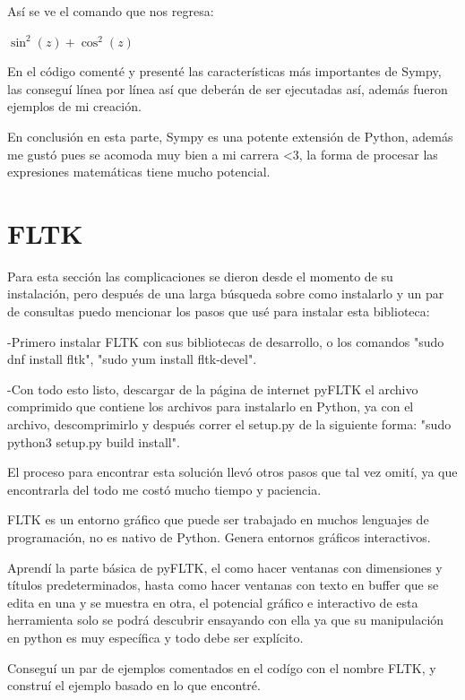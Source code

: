 \documentclass[]{article}
\begin{document}
Así se ve el comando que nos regresa:

$ \sin^{2}{\left(z \right)} + \cos^{2}{\left(z \right)} $

En el código comenté y presenté las características más importantes de Sympy, las conseguí línea por línea así que deberán de ser ejecutadas así, además fueron ejemplos de mi creación.

En conclusión en esta parte, Sympy es una potente extensión de Python, además me gustó pues se acomoda muy bien a mi carrera <3, la forma de procesar las expresiones matemáticas tiene mucho potencial.
\section{FLTK}
Para esta sección las complicaciones se dieron desde el momento de su instalación, pero después de una larga búsqueda sobre como instalarlo y un par de consultas puedo mencionar los pasos que usé para instalar esta biblioteca:

	-Primero instalar FLTK con sus bibliotecas de desarrollo, o los comandos "sudo dnf install fltk", "sudo yum install fltk-devel".
	
	-Con todo esto listo, descargar de la página de internet pyFLTK el archivo comprimido que contiene los archivos para instalarlo en Python, ya con el archivo, descomprimirlo y después correr el setup.py de la siguiente forma: "sudo python3 setup.py build install".
	
	El proceso para encontrar esta solución llevó otros pasos que tal vez omití, ya que encontrarla del todo me costó mucho tiempo y paciencia.
	
FLTK es un entorno gráfico que puede ser trabajado en muchos lenguajes de programación, no es nativo de Python. Genera entornos gráficos interactivos.

Aprendí la parte básica de pyFLTK, el como hacer ventanas con dimensiones y títulos predeterminados, hasta como hacer ventanas con texto en buffer que se edita en una y se muestra en otra, el potencial gráfico e interactivo de esta herramienta solo se podrá descubrir ensayando con ella ya que su manipulación en python es muy específica y todo debe ser explícito.

Conseguí un par de ejemplos comentados en el codígo con el nombre FLTK, y construí el ejemplo basado en lo que encontré.
\end{document}
